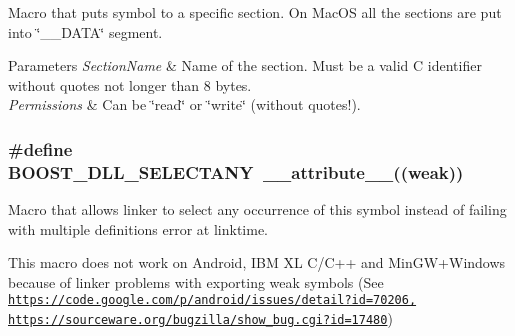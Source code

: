 Macro that puts symbol to a specific section. On Mac\+OS all the sections are put into \char`\"{}\+\_\+\+\_\+\+D\+A\+T\+A\char`\"{} segment. 


\begin{DoxyParams}{Parameters}
{\em Section\+Name} & Name of the section. Must be a valid C identifier without quotes not longer than 8 bytes. \\
\hline
{\em Permissions} & Can be \char`\"{}read\char`\"{} or \char`\"{}write\char`\"{} (without quotes!). \\
\hline
\end{DoxyParams}
\subsubsection[{\texorpdfstring{B\+O\+O\+S\+T\+\_\+\+D\+L\+L\+\_\+\+S\+E\+L\+E\+C\+T\+A\+NY}{BOOST\_DLL\_SELECTANY}}]{\setlength{\rightskip}{0pt plus 5cm}\#define B\+O\+O\+S\+T\+\_\+\+D\+L\+L\+\_\+\+S\+E\+L\+E\+C\+T\+A\+NY~\+\_\+\+\_\+attribute\+\_\+\+\_\+((weak))}\hypertarget{a00359_a18e217f7c26bce9cb08c64f41fbd6178}{}\label{a00359_a18e217f7c26bce9cb08c64f41fbd6178}


Macro that allows linker to select any occurrence of this symbol instead of failing with \textquotesingle{}multiple definitions\textquotesingle{} error at linktime. 

This macro does not work on Android, I\+BM XL C/\+C++ and Min\+G\+W+\+Windows because of linker problems with exporting weak symbols (See \href{https://code.google.com/p/android/issues/detail?id=70206,}{\tt https\+://code.\+google.\+com/p/android/issues/detail?id=70206,} \href{https://sourceware.org/bugzilla/show_bug.cgi?id=17480}{\tt https\+://sourceware.\+org/bugzilla/show\+\_\+bug.\+cgi?id=17480}) 
